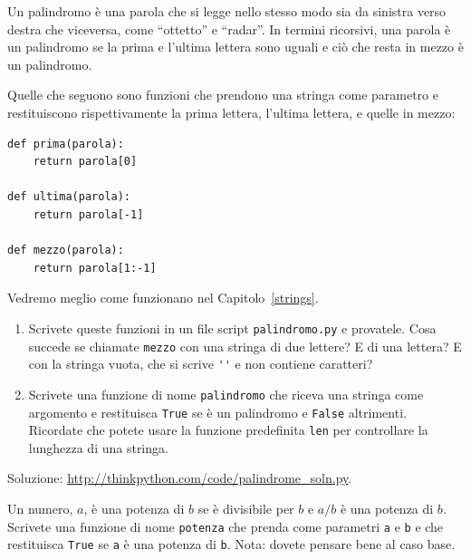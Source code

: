 \documentclass[10pt]{book}
\begin{document}
\vspace{0.2in}
\begin{exercise}
\label{palindrome}

Un palindromo è una parola che si legge nello stesso modo sia da sinistra verso destra che viceversa, come ``ottetto'' e ``radar''. In termini ricorsivi, una parola è un palindromo se la prima e l'ultima lettera sono uguali e ciò che resta in mezzo è un palindromo.

Quelle che seguono sono funzioni che prendono una stringa come parametro e restituiscono rispettivamente la prima lettera, l'ultima lettera, e quelle in mezzo:

\begin{verbatim}
def prima(parola):
    return parola[0]

def ultima(parola):
    return parola[-1]

def mezzo(parola):
    return parola[1:-1]
\end{verbatim}
%
Vedremo meglio come funzionano nel Capitolo~\ref{strings}.

\begin{enumerate}

\item Scrivete queste funzioni in un file script {\tt palindromo.py}
e provatele. Cosa succede se chiamate {\tt mezzo} con una stringa di due lettere?  E di una lettera?  E con la stringa vuota, che si scrive \verb"''" e non contiene caratteri?

\item Scrivete una funzione di nome \verb"palindromo" che riceva una stringa come argomento e restituisca {\tt True} se è un palindromo e {\tt False} altrimenti. Ricordate che potete usare la funzione predefinita {\tt len} per controllare la lunghezza di una stringa.

\end{enumerate}

Soluzione: \url{http://thinkpython.com/code/palindrome_soln.py}.

\end{exercise}

\vspace{0.2in}
\begin{exercise}

Un numero, $a$, è una potenza di $b$ se è divisibile per $b$
e $a/b$ è una potenza di $b$.  Scrivete una funzione di nome
\verb"potenza" che prenda come parametri {\tt a} e {\tt b}
e che restituisca {\tt True} se {\tt a} è una potenza di {\tt b}.
Nota: dovete pensare bene al caso base.

\end{exercise}
\end{document}
